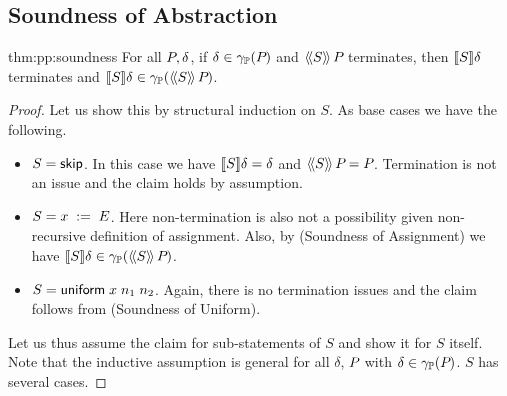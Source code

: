 \subsection{Soundness of Abstraction}
\begin{reptheorem}{thm:pp:soundness}
For all $P_{}, \delta$, if $ \delta \in \gamma_{\mathbb{P}}(P_{}) $ and
$ \langle\!\langle{S}\rangle\!\rangle\,{P_{}} $ terminates, then $ [\![{S}]\!]{\delta} $ terminates and $ [\![{S}]\!]{\delta} \in \gamma_{\mathbb{P}}(\langle\!\langle{S}\rangle\!\rangle\,{P_{}}) $.
\end{reptheorem}

\begin{proof} Let us show this by structural induction on $ S $. As base cases we have the following.

\begin{itemize}
\item{} $ S = \mathsf{skip} $. In this case we have $ [\![{S}]\!]{\delta}
= \delta $ and $ \langle\!\langle{S}\rangle\!\rangle\,{P_{}} = P_{} $. Termination is not an
issue and the claim holds by assumption.
\item{} $ S = {x}\;:=\;{E} $. Here non-termination is also not a
possibility given non-recursive definition of assignment. Also, by
  (Soundness of Assignment) we have
$ [\![{S}]\!]{\delta} \in \gamma_{\mathbb{P}}(\langle\!\langle{S}\rangle\!\rangle\,{P_{}}) $.
\item{} $ S = \mathsf{uniform}\;{x}\;{n_1}\;n_2 $. Again, there is no termination
 issues and the claim follows from  (Soundness of Uniform).
\end{itemize} 

Let us thus assume the claim for sub-statements of $ S $ and show it
for $ S $ itself. Note that the inductive assumption is general for
all $ \delta $, $ P_{} $ with $ \delta \in \gamma_{\mathbb{P}}(P_{})
$. $ S $
has several cases.


\end{proof}
